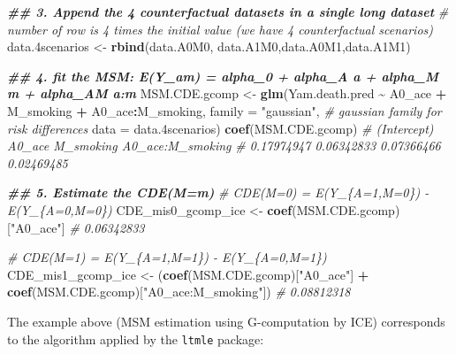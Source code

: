 \documentclass[
]{book}
\newenvironment{Shaded}{\begin{snugshade}}{\end{snugshade}}
\newcommand{\AttributeTok}[1]{\textcolor[rgb]{0.13,0.29,0.53}{#1}}
\newcommand{\CommentTok}[1]{\textcolor[rgb]{0.56,0.35,0.01}{\textit{#1}}}
\newcommand{\DocumentationTok}[1]{\textcolor[rgb]{0.56,0.35,0.01}{\textbf{\textit{#1}}}}
\newcommand{\FloatTok}[1]{\textcolor[rgb]{0.00,0.00,0.81}{#1}}
\newcommand{\FunctionTok}[1]{\textcolor[rgb]{0.13,0.29,0.53}{\textbf{#1}}}
\newcommand{\NormalTok}[1]{#1}
\newcommand{\OtherTok}[1]{\textcolor[rgb]{0.56,0.35,0.01}{#1}}
\newcommand{\SpecialCharTok}[1]{\textcolor[rgb]{0.81,0.36,0.00}{\textbf{#1}}}
\newcommand{\StringTok}[1]{\textcolor[rgb]{0.31,0.60,0.02}{#1}}
\begin{document}
\begin{Shaded}
\begin{Highlighting}[]
\DocumentationTok{\#\# 3. Append the 4 counterfactual datasets in a single long dataset}
\CommentTok{\# number of row is 4 times the initial value (we have 4 counterfactual scenarios)}
\NormalTok{data}\FloatTok{.4}\NormalTok{scenarios }\OtherTok{\textless{}{-}} \FunctionTok{rbind}\NormalTok{(data.A0M0, data.A1M0,data.A0M1,data.A1M1)}

\DocumentationTok{\#\# 4. fit the MSM: E(Y\_am) = alpha\_0 + alpha\_A a + alpha\_M m + alpha\_AM a:m}
\NormalTok{MSM.CDE.gcomp }\OtherTok{\textless{}{-}} \FunctionTok{glm}\NormalTok{(Yam.death.pred }\SpecialCharTok{\textasciitilde{}}\NormalTok{ A0\_ace }\SpecialCharTok{+}\NormalTok{  M\_smoking }\SpecialCharTok{+}\NormalTok{ A0\_ace}\SpecialCharTok{:}\NormalTok{M\_smoking,}
                     \AttributeTok{family =} \StringTok{"gaussian"}\NormalTok{, }\CommentTok{\# gaussian family for risk differences}
                     \AttributeTok{data =}\NormalTok{ data}\FloatTok{.4}\NormalTok{scenarios)}
\FunctionTok{coef}\NormalTok{(MSM.CDE.gcomp)}
\CommentTok{\# (Intercept)           A0\_ace        M\_smoking A0\_ace:M\_smoking}
\CommentTok{\#  0.17974947       0.06342833       0.07366466       0.02469485}

\DocumentationTok{\#\# 5. Estimate the CDE(M=m)}
\CommentTok{\# CDE(M=0) = E(Y\_\{A=1,M=0\}) {-} E(Y\_\{A=0,M=0\})}
\NormalTok{CDE\_mis0\_gcomp\_ice }\OtherTok{\textless{}{-}} \FunctionTok{coef}\NormalTok{(MSM.CDE.gcomp)[}\StringTok{"A0\_ace"}\NormalTok{]}
\CommentTok{\# 0.06342833}

\CommentTok{\# CDE(M=1) = E(Y\_\{A=1,M=1\}) {-} E(Y\_\{A=0,M=1\})}
\NormalTok{CDE\_mis1\_gcomp\_ice }\OtherTok{\textless{}{-}}\NormalTok{ (}\FunctionTok{coef}\NormalTok{(MSM.CDE.gcomp)[}\StringTok{"A0\_ace"}\NormalTok{] }\SpecialCharTok{+}
                         \FunctionTok{coef}\NormalTok{(MSM.CDE.gcomp)[}\StringTok{"A0\_ace:M\_smoking"}\NormalTok{])}
\CommentTok{\# 0.08812318}
\end{Highlighting}
\end{Shaded}

The example above (MSM estimation using G-computation by ICE) corresponds to the algorithm applied by the \texttt{ltmle} package:
\end{document}
